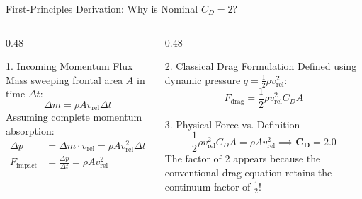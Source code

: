 \documentclass[aspectratio=169,11pt]{beamer}
\begin{document}
\begin{frame}{First-Principles Derivation: Why is Nominal $C_D = 2$?}
    \begin{columns}[t]
        \begin{column}{0.48\textwidth}
            \begin{block}{1. Incoming Momentum Flux}
                \small
                Mass sweeping frontal area $A$ in time $\Delta t$:
                {\small
                \begin{equation*}
                    \Delta m = \rho A v_{\text{rel}} \Delta t
                \end{equation*}
                }
                \vspace{-0.3cm}
                Assuming complete momentum absorption:
                {\small
                \begin{align*}
                    \Delta p &= \Delta m \cdot v_{\text{rel}} = \rho A v_{\text{rel}}^2 \Delta t \\
                    F_{\text{impact}} &= \frac{\Delta p}{\Delta t} = \rho A v_{\text{rel}}^2
                \end{align*}
                }
            \end{block}
        \end{column}

        \begin{column}{0.48\textwidth}
            \begin{block}{2. Classical Drag Formulation}
                \small
                Defined using dynamic pressure $q = \frac{1}{2}\rho v_{\text{rel}}^2$:
                {\small
                \begin{equation*}
                    F_{\text{drag}} = \frac{1}{2}\rho v_{\text{rel}}^2 C_D A
                \end{equation*}
                }
            \end{block}
            \vspace{-0.1cm}
            \begin{alertblock}{3. Physical Force vs. Definition}
                \small
                \begin{equation*}
                    \frac{1}{2} \rho v_{\text{rel}}^2 C_D A = \rho A v_{\text{rel}}^2 \implies \mathbf{C_D = 2.0}
                \end{equation*}
                The factor of $2$ appears because the conventional drag equation retains the continuum factor of $\frac{1}{2}$!
            \end{alertblock}
        \end{column}
    \end{columns}
\end{frame}
\end{document}
